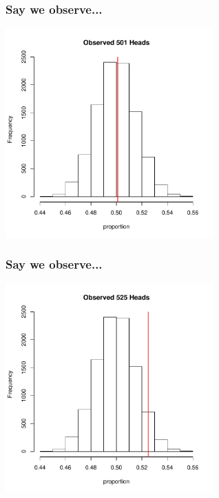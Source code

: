 \documentclass[handout]{beamer}
\begin{document}
\begin{frame}
\frametitle{Say we observe...}
\begin{center}
\includegraphics[width=0.6\textwidth]{figure/hist2}
\end{center}
\end{frame}


\begin{frame}
\frametitle{Say we observe...}
\begin{center}
\includegraphics[width=0.6\textwidth]{figure/hist3}
\end{center}
\end{frame}
\end{document}
